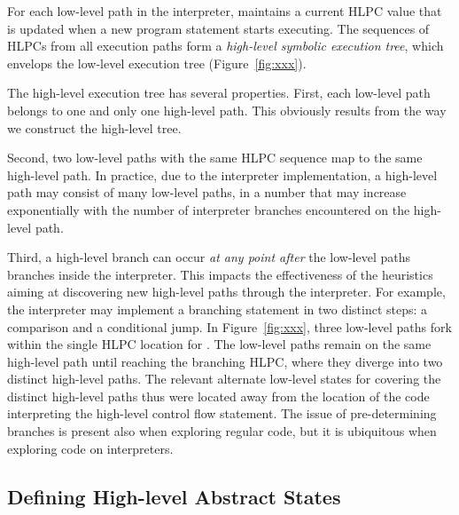 
For each low-level path in the interpreter, \chef maintains a current HLPC value that is updated when a new program statement starts executing.
%
The sequences of HLPCs from all execution paths form a \emph{high-level symbolic execution tree}, which envelops the low-level execution tree (Figure~\ref{fig:xxx}).

The high-level execution tree has several properties.  First, each low-level path belongs to one and only one high-level path.  This obviously results from the way we construct the high-level tree.

Second, two low-level paths with the same HLPC sequence map to the same high-level path.  In practice, due to the interpreter implementation, a high-level path may consist of many low-level paths, in a number that may increase exponentially with the number of interpreter branches encountered on the high-level path.

Third, a high-level branch can occur \emph{at any point after} the low-level paths branches inside the interpreter.  This impacts the effectiveness of the heuristics aiming at discovering new high-level paths through the interpreter.
%
For example, the interpreter may implement a branching statement in two distinct steps: a comparison and a conditional jump.  In Figure~\ref{fig:xxx}, three low-level paths fork within the single HLPC location for .  The low-level paths remain on the same high-level path until reaching the branching HLPC, where they diverge into two distinct high-level paths.  The relevant alternate low-level states for covering the distinct high-level paths thus were located away from the location of the code interpreting the high-level control flow statement.
%
The issue of pre-determining branches is present also when exploring regular code, but it is ubiquitous when exploring code on interpreters.



\subsection{Defining High-level Abstract States}
\label{sec:chef:hlstates}

